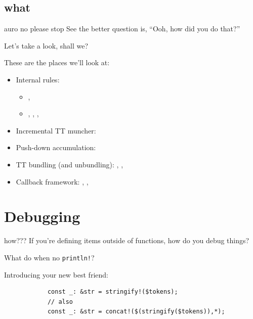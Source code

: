 \documentclass{beamer}
\begin{document}
	\subsection{what}
	\begin{frame}{auro no please stop}
		See the better question is, ``Ooh, how did you do that?'' \\

		\pause

		Let's take a look, shall we?
	\end{frame}

	\begin{frame}
		These are the places we'll look at:

		\small
		\begin{itemize}
			\item Internal rules:
			\begin{itemize}
				\item {}, 
				\item {}, , ,
			\end{itemize}
			\pause
			\item Incremental TT muncher: 
			\pause
			\item Push-down accumulation: 
			\pause
			\item TT bundling (and unbundling): ,
				,
			\pause
			\item Callback framework: ,
				,
		\end{itemize}
	\end{frame}

	\section{Debugging}
	\begin{frame}[fragile]{how???}
		If you're defining items outside of functions, how do you debug things? \\

		\pause

		What do when no \texttt{println!}? \\

		\pause

		Introducing your new best friend:
		\begin{verbatim}
			const _: &str = stringify!($tokens);
			// also
			const _: &str = concat!($(stringify($tokens)),*);
		\end{verbatim}
	\end{frame}
\end{document}
